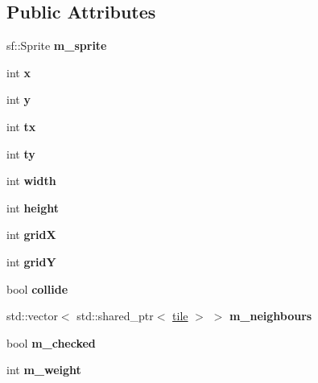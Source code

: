 \subsection*{Public Attributes}
\begin{DoxyCompactItemize}
\item 
\mbox{\label{structtile_a790baf3d05c54bbd194d0e6940053df0}} 
sf\+::\+Sprite {\bfseries m\+\_\+sprite}
\item 
\mbox{\label{structtile_aec9b69010e01f17aa3afb2e91f3f73d6}} 
int {\bfseries x}
\item 
\mbox{\label{structtile_a630b4175a6abf97b1ca3e7e3684d3ac7}} 
int {\bfseries y}
\item 
\mbox{\label{structtile_a79590524f45ca493befa96473ade2e68}} 
int {\bfseries tx}
\item 
\mbox{\label{structtile_a424e37d690641e72afb4e63117af8cd0}} 
int {\bfseries ty}
\item 
\mbox{\label{structtile_ae83d0ccc5404ac1ddd67527f4867ace0}} 
int {\bfseries width}
\item 
\mbox{\label{structtile_a31d25e01ca72c34bb93be2d9f8c902f2}} 
int {\bfseries height}
\item 
\mbox{\label{structtile_a1a7c82b449e5673eb0d760fdaf2c5c08}} 
int {\bfseries gridX}
\item 
\mbox{\label{structtile_a385b9dfc49dc6ad7afd8618fc5b09f0d}} 
int {\bfseries gridY}
\item 
\mbox{\label{structtile_a8bc15201aaa8a5caf630bb7eb7c93475}} 
bool {\bfseries collide}
\item 
\mbox{\label{structtile_ad77f789bc5d41fc3ddcf760c5d2cee1d}} 
std\+::vector$<$ std\+::shared\+\_\+ptr$<$ \mbox{\hyperlink{structtile}{tile}} $>$ $>$ {\bfseries m\+\_\+neighbours}
\item 
\mbox{\label{structtile_a7f20a538f3b544c5c82e8a3ae92680f7}} 
bool {\bfseries m\+\_\+checked}
\item 
\mbox{\label{structtile_aec3379ed06b32077a4c1c7d66a026120}} 
int {\bfseries m\+\_\+weight}
\end{DoxyCompactItemize}


